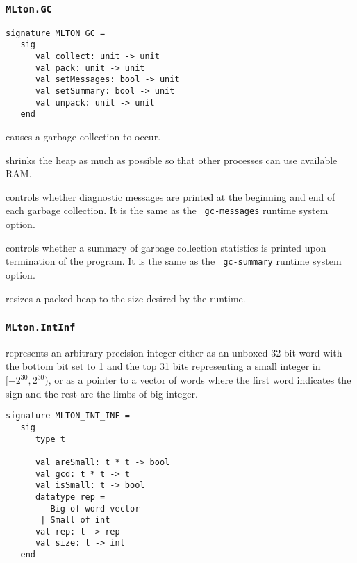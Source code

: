 \subsubsection{{\tt MLton.GC}}
%
\begin{verbatim}
signature MLTON_GC =
   sig
      val collect: unit -> unit
      val pack: unit -> unit
      val setMessages: bool -> unit
      val setSummary: bool -> unit
      val unpack: unit -> unit
   end
\end{verbatim}

\begin{description}
causes a garbage collection to occur.

shrinks the heap as much as possible so that other processes can use
available RAM.

controls whether diagnostic messages are printed at the beginning and
end of each garbage collection.  It is the same as the {\tt
gc-messages} runtime system option.

controls whether a summary of garbage collection statistics is printed
upon termination of the program.  It is the same as the {\tt
gc-summary} runtime system option.

resizes a packed heap to the size desired by the runtime.

\end{description}
%
\subsubsection{{\tt MLton.IntInf}}

{\mlton} represents an arbitrary precision integer either as an
unboxed 32 bit word with the bottom bit set to 1 and the top 31 bits
representing a small integer in $[-2^{30}, 2^{30})$, or as a pointer
to a vector of words where the first word indicates the sign and the
rest are the limbs of {\gmp} big integer.
\begin{verbatim}
signature MLTON_INT_INF =
   sig
      type t

      val areSmall: t * t -> bool
      val gcd: t * t -> t
      val isSmall: t -> bool
      datatype rep =
         Big of word vector
       | Small of int
      val rep: t -> rep
      val size: t -> int
   end
\end{verbatim}

